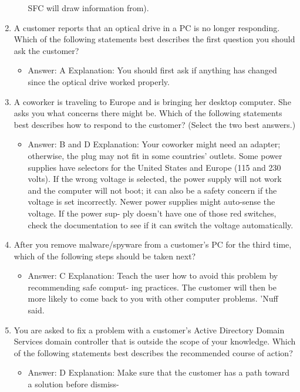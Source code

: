 \documentclass{article}
\begin{document}
\begin{enumerate}
\begin{itemize}
SFC will draw information from).
    \end{itemize}
    \item A customer reports that an optical drive in a PC is no longer
responding. Which of the following statements best describes the
first question you should ask the customer?
    \begin{itemize}
        \item Answer: A
Explanation: You should first ask if anything has changed since the optical drive
worked properly.
    \end{itemize}
    \item A coworker is traveling to Europe and is bringing her desktop
computer. She asks you what concerns there might be. Which of
the following statements best describes how to respond to the
customer? (Select the two best answers.)
    \begin{itemize}
        \item Answer: B and D
Explanation: Your coworker might need an adapter; otherwise, the plug may not fit in
some countries’ outlets. Some power supplies have selectors for the United States and
Europe (115 and 230 volts). If the wrong voltage is selected, the power supply will not
work and the computer will not boot; it can also be a safety concern if the voltage is
set incorrectly. Newer power supplies might auto-sense the voltage. If the power sup-
ply doesn’t have one of those red switches, check the documentation to see if it can
switch the voltage automatically.
    \end{itemize}
    \item After you remove malware/spyware from a customer’s PC for the
third time, which of the following steps should be taken next?
    \begin{itemize}
        \item Answer: C
Explanation: Teach the user how to avoid this problem by recommending safe comput-
ing practices. The customer will then be more likely to come back to you with other
computer problems. ’Nuff said.
    \end{itemize}
    \item You are asked to fix a problem with a customer’s Active Directory
Domain Services domain controller that is outside the scope of
your knowledge. Which of the following statements best describes
the recommended course of action?
    \begin{itemize}
        \item Answer: D
Explanation: Make sure that the customer has a path toward a solution before dismiss-

\end{itemize}
\end{enumerate}
\end{document}
